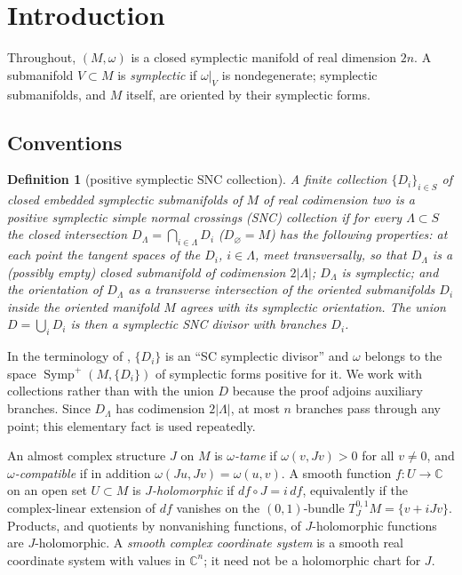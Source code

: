 \documentclass[11pt]{article}
\newtheorem{definition}[theorem]{Definition}
\theoremstyle{remark}
\newcommand{\C}{\mathbb C}
\newcommand{\Symp}{\operatorname{Symp}}
\begin{document}
\section{Introduction}

Throughout, $(M,\omega)$ is a closed symplectic manifold of real
dimension $2n$. A submanifold $V\subset M$ is \emph{symplectic} if
$\omega|_V$ is nondegenerate; symplectic submanifolds, and $M$ itself,
are oriented by their symplectic forms.

\subsection*{Conventions}

\begin{definition}[positive symplectic SNC collection]\label{def:snc}
A finite collection $\{D_i\}_{i\in S}$ of closed embedded symplectic
submanifolds of $M$ of real codimension two is a \emph{positive
symplectic simple normal crossings (SNC) collection} if for every
$\Lambda\subset S$ the \emph{closed intersection}
$D_\Lambda=\bigcap_{i\in\Lambda}D_i$ ($D_\varnothing=M$) has the
following properties: at each point the tangent spaces of the $D_i$,
$i\in\Lambda$, meet transversally, so that $D_\Lambda$ is a (possibly
empty) closed submanifold of codimension $2|\Lambda|$; $D_\Lambda$ is
symplectic; and the orientation of $D_\Lambda$ as a transverse
intersection of the oriented
submanifolds $D_i$ inside the oriented manifold $M$ agrees with its
symplectic orientation. The union $D=\bigcup_iD_i$ is then a
\emph{symplectic SNC divisor} with \emph{branches} $D_i$.
\end{definition}

In the terminology of \cite{FMZ}, $\{D_i\}$ is an ``SC symplectic
divisor'' and $\omega$ belongs to the space $\Symp^+(M,\{D_i\})$ of
symplectic forms positive for it. We work with collections rather than
with the union $D$ because the proof adjoins auxiliary branches. Since
$D_\Lambda$ has codimension $2|\Lambda|$, at most $n$ branches pass
through any point; this elementary fact is used repeatedly.

An almost complex structure $J$ on $M$ is \emph{$\omega$-tame} if
$\omega(v,Jv)>0$ for all $v\neq0$, and \emph{$\omega$-compatible} if in
addition $\omega(Ju,Jv)=\omega(u,v)$. A smooth function $f\colon U\to\C$
on an open set $U\subset M$ is \emph{$J$-holomorphic} if
$df\circ J=i\,df$, equivalently if the complex-linear extension of $df$
vanishes on the $(0,1)$-bundle $T^{0,1}_JM=\{v+iJv\}$. Products, and
quotients by nonvanishing functions, of $J$-holomorphic functions are
$J$-holomorphic. A \emph{smooth complex coordinate system} is a smooth
real coordinate system with values in $\C^n$; it need not be a
holomorphic chart for $J$.
\end{document}
